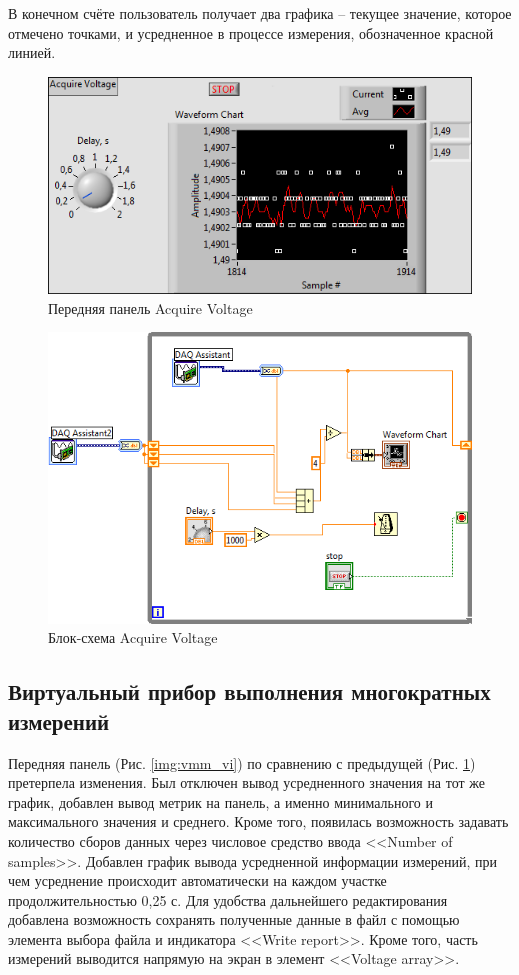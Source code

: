 \documentclass[a4paper,14pt]{article}
\begin{document}
В конечном счёте пользователь получает два графика -- текущее значение, которое отмечено точками, и усредненное в процессе измерения, обозначенное красной линией.

\begin{figure}[H]
    \centering
    \includegraphics[width=\linewidth]{image/av_vi}
    \caption{Передняя панель Acquire Voltage}\label{img:av_vi}
\end{figure}


\begin{figure}[H]
    \centering
    \includegraphics[width=\linewidth]{image/av_schema}
    \caption{Блок-схема Acquire Voltage}\label{img:av_schema}
\end{figure}

\subsection{Виртуальный прибор выполнения многократных измерений }

Передняя панель (Рис. \ref{img:vmm_vi})  по сравнению с предыдущей (Рис. \ref{img:av_vi}) претерпела изменения.
Был отключен вывод усредненного значения на тот же график, добавлен вывод метрик на панель, а именно минимального и максимального значения и среднего.
Кроме того, появилась возможность задавать количество сборов данных через числовое средство ввода <<Number of samples>>.
Добавлен график вывода усредненной информации измерений, при чем усреднение происходит автоматически на каждом участке продолжительностью 0,25 с.
Для удобства дальнейшего редактирования добавлена возможность сохранять полученные данные в файл с помощью элемента выбора файла и индикатора <<Write report>>.
Кроме того, часть измерений выводится напрямую на экран в элемент <<Voltage array>>.
\end{document}
